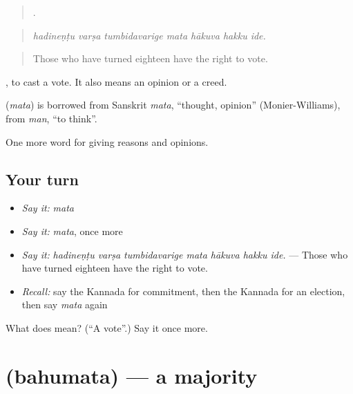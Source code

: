 \begin{quote}
      .
\end{quote}

\begin{quote}
\emph{hadineṇṭu varṣa tumbidavarige mata hākuva hakku ide.}
\end{quote}

\begin{quote}
Those who have turned eighteen have the right to vote.
\end{quote}

 , to cast a vote. It also means an opinion or a creed.

\begin{cousinweb}
\textbf{} (\emph{mata}) is borrowed from Sanskrit \emph{mata}, \textquotedblleft{}thought, opinion\textquotedblright{} (Monier-Williams), from \emph{man}, \textquotedblleft{}to think\textquotedblright{}.
\end{cousinweb}

\begin{grammarlens}[title={What you've built}]
One more word for giving reasons and opinions.
\end{grammarlens}

\subsection*{Your turn}
\begin{itemize}
\raggedright
  \item \emph{Say it:} \emph{mata}
  \item \emph{Say it:} \emph{mata}, once more
  \item \emph{Say it:} \emph{hadineṇṭu varṣa tumbidavarige mata hākuva hakku ide.} — Those who have turned eighteen have the right to vote.
  \item \emph{Recall:} say the Kannada for commitment, then the Kannada for an election, then say \emph{mata} again
\end{itemize}

\begin{tcolorbox}[breakable,colback=teal!4,colframe=teal!35!black,title={Before you move on}]
What does  mean? (\textquotedblleft{}A vote\textquotedblright{}.) Say it once more.
\end{tcolorbox}
\section[\texorpdfstring{\kn{ಬಹುಮತ} (bahumata)}{ಬಹುಮತ (bahumata)}]{ (bahumata) — a majority}

